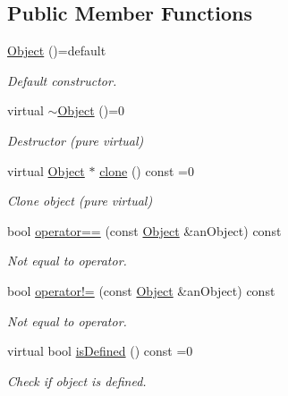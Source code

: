 \subsection*{Public Member Functions}
\begin{DoxyCompactItemize}
\item 
\hyperlink{classlibrary_1_1math_1_1geom_1_1d2_1_1_object_a35b722f64aded8d8e660074a23af237a}{Object} ()=default
\begin{DoxyCompactList}\small\item\em Default constructor. \end{DoxyCompactList}\item 
virtual \hyperlink{classlibrary_1_1math_1_1geom_1_1d2_1_1_object_a092ca69d924f7226fceeb35f5532887c}{$\sim$\+Object} ()=0
\begin{DoxyCompactList}\small\item\em Destructor (pure virtual) \end{DoxyCompactList}\item 
virtual \hyperlink{classlibrary_1_1math_1_1geom_1_1d2_1_1_object}{Object} $\ast$ \hyperlink{classlibrary_1_1math_1_1geom_1_1d2_1_1_object_a5c26ae4120edb24f6463d65a9cef247d}{clone} () const =0
\begin{DoxyCompactList}\small\item\em Clone object (pure virtual) \end{DoxyCompactList}\item 
bool \hyperlink{classlibrary_1_1math_1_1geom_1_1d2_1_1_object_a97aeb08c0dbe7f803188ae335f6b0e7a}{operator==} (const \hyperlink{classlibrary_1_1math_1_1geom_1_1d2_1_1_object}{Object} \&an\+Object) const
\begin{DoxyCompactList}\small\item\em Not equal to operator. \end{DoxyCompactList}\item 
bool \hyperlink{classlibrary_1_1math_1_1geom_1_1d2_1_1_object_a538fa27124314cddf9705cf35a3efc08}{operator!=} (const \hyperlink{classlibrary_1_1math_1_1geom_1_1d2_1_1_object}{Object} \&an\+Object) const
\begin{DoxyCompactList}\small\item\em Not equal to operator. \end{DoxyCompactList}\item 
virtual bool \hyperlink{classlibrary_1_1math_1_1geom_1_1d2_1_1_object_ae9506254971168a3ca63e1923556b70d}{is\+Defined} () const =0
\begin{DoxyCompactList}\small\item\em Check if object is defined. \end{DoxyCompactList}\item 

\end{DoxyCompactItemize}
